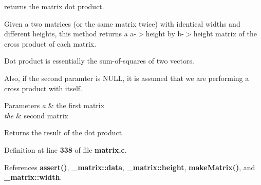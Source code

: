 returns the matrix dot product. 

Given a two matrices (or the same matrix twice) with identical widths and different heights, this method returns a a-\/$>$height by b-\/$>$height matrix of the cross product of each matrix.

Dot product is essentially the sum-\/of-\/squares of two vectors.

Also, if the second paramter is N\+U\+LL, it is assumed that we are performing a cross product with itself. 
\begin{DoxyParams}{Parameters}
{\em a} & the first matrix \\
\hline
{\em the} & second matrix \\
\hline
\end{DoxyParams}
\begin{DoxyReturn}{Returns}
the result of the dot product 
\end{DoxyReturn}


Definition at line \textbf{ 338} of file \textbf{ matrix.\+c}.



References \textbf{ assert()}, \textbf{ \+\_\+matrix\+::data}, \textbf{ \+\_\+matrix\+::height}, \textbf{ make\+Matrix()}, and \textbf{ \+\_\+matrix\+::width}.


